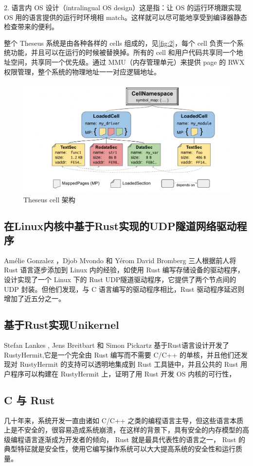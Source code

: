 \documentclass{article}
\begin{document}
2. 语言内 OS 设计（intralingual OS design）这是指：让 OS 的运行环境跟实现 OS 用的语言提供的运行时环境相 match。这样就可以尽可能地享受到编译器静态检查带来的便利。

整个 Theseus 系统是由各种各样的 cells 组成的，见\ref{fig:2}，每个 cell 负责一个系统功能，并且可以在运行的时候被替换掉。所有的 cell 和用户代码共享同一个地址空间，共享同一个优先级。通过 MMU（内存管理单元）来提供 page 的 RWX 权限管理，整个系统的物理地址一一对应逻辑地址。
\begin{figure}[htbp]
    \centering
    \includegraphics[width = \textwidth]{figs/cells.png}
    \caption{Theseus cell 架构}
    \label{fig:3}
\end{figure}
\subsection{在Linux内核中基于Rust实现的UDP隧道网络驱动程序} 
Amélie Gonzalez ，Djob Mvondo 和 Yérom David Bromberg 三人根据前人将 Rust 语言逐步添加到 Linux 内的经验，如使用 Rust 编写存储设备的驱动程序，设计实现了一个 Linux 下的 Rust UDP隧道驱动程序，\supercite{ref9}它提供了两个节点间的 UDP 封装。但他们发现，与 C 语言编写的驱动程序相比，Rust 驱动程序延迟则增加了近五分之一。
\subsection{基于Rust实现Unikernel}
Stefan Lankes , Jens Breitbart 和 Simon Pickartz 基于Rust语言设计开发了 RustyHermit,\supercite{ref10}它是一个完全由 Rust 编写而不需要 C/C++ 的单核，并且他们还发现对 RustyHermit 的支持可以透明地集成到 Rust 工具链中，并且公共的 Rust 用户程序可以构建在 RustyHermit 上，证明了用 Rust 开发 OS 内核的可行性，
\subsection{C 与 Rust}
几十年来，系统开发一直由诸如 C/C++ 之类的编程语言主导，但这些语言本质上是不安全的，很容易造成系统崩溃，在这样的背景下，具有安全的内存模型的高级编程语言逐渐成为开发者的倾向， Rust 就是最具代表性的语言之一， Rust 的典型特征就是安全性，使用它编写操作系统可以大大提高系统的安全性和运行质量。
\end{document}
